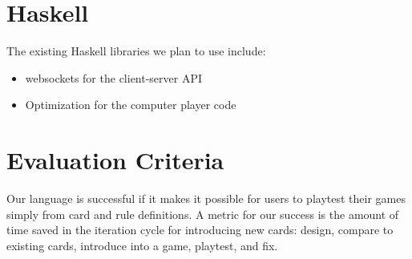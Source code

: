 \documentclass{acm_proc_article-sp}
\begin{document}
\section{Haskell}
\label{sec:haskell}

The existing Haskell libraries we plan to use include:

\begin{itemize}
\item websockets \textendash for the client-server API
\item Optimization \textendash for the computer player code
\end{itemize}
\section{Evaluation Criteria}
\label{sec:evaluation}
Our language is successful if it makes it possible for users to playtest their
games simply from card and rule definitions. A metric for our success is the
amount of time saved in the iteration cycle for introducing new cards: design,
compare to existing cards, introduce into a game, playtest, and fix.

\begin{biblist}
\end{biblist}

\end{document}

